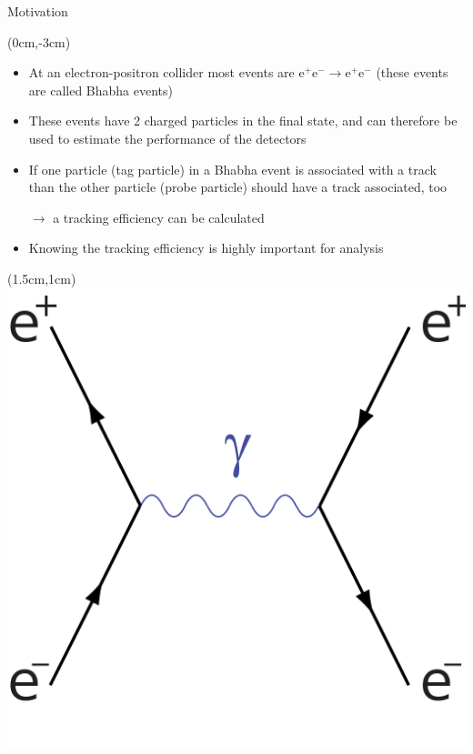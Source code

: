 \documentclass[8pt]{beamer}
\begin{document}
\begin{frame}{Motivation}
	\begin{textblock*}{11cm}(0cm,-3cm)
		
	\begin{itemize}
		\item At an electron-positron collider most events are $\textrm{e}^+ \textrm{e}^- \rightarrow\textrm{e}^+ \textrm{e}^- $ (these events are called Bhabha events)
		\item These events have 2 charged particles in the final state, and can therefore be used to estimate the performance of the detectors
		\item If one particle (tag particle) in a Bhabha event is associated with a track than the other particle (probe particle)  should have a track associated, too 
		
		$\rightarrow$ a tracking efficiency can be calculated
		\item Knowing the tracking efficiency is highly important for analysis 
	\end{itemize}
\end{textblock*}




\begin{textblock*}{3cm}(1.5cm,1cm)
	\includegraphics[width=\textwidth]{VBilder/bhabhaS}
\end{textblock*}


\end{frame}
\end{document}
